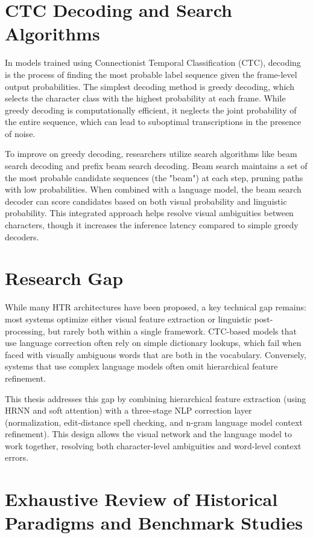 \section{CTC Decoding and Search Algorithms}
In models trained using Connectionist Temporal Classification (CTC), decoding is the process of finding the most probable label sequence given the frame-level output probabilities. The simplest decoding method is greedy decoding, which selects the character class with the highest probability at each frame. While greedy decoding is computationally efficient, it neglects the joint probability of the entire sequence, which can lead to suboptimal transcriptions in the presence of noise.

To improve on greedy decoding, researchers utilize search algorithms like beam search decoding and prefix beam search decoding. Beam search maintains a set of the most probable candidate sequences (the "beam") at each step, pruning paths with low probabilities. When combined with a language model, the beam search decoder can score candidates based on both visual probability and linguistic probability. This integrated approach helps resolve visual ambiguities between characters, though it increases the inference latency compared to simple greedy decoders.

\section{Research Gap}
While many HTR architectures have been proposed, a key technical gap remains: most systems optimize either visual feature extraction or linguistic post-processing, but rarely both within a single framework. CTC-based models that use language correction often rely on simple dictionary lookups, which fail when faced with visually ambiguous words that are both in the vocabulary. Conversely, systems that use complex language models often omit hierarchical feature refinement. 

This thesis addresses this gap by combining hierarchical feature extraction (using HRNN and soft attention) with a three-stage NLP correction layer (normalization, edit-distance spell checking, and n-gram language model context refinement). This design allows the visual network and the language model to work together, resolving both character-level ambiguities and word-level context errors.

\section{Exhaustive Review of Historical Paradigms and Benchmark Studies}

